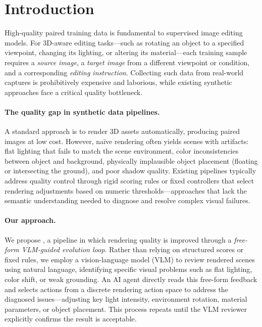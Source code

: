 \section{Introduction}
\label{sec:intro}

High-quality paired training data is fundamental to supervised image editing models.
For 3D-aware editing tasks---such as rotating an object to a specified viewpoint,
changing its lighting, or altering its material---each training sample requires
a \emph{source image}, a \emph{target image} from a different viewpoint or condition,
and a corresponding \emph{editing instruction}.
Collecting such data from real-world captures is prohibitively expensive and laborious,
while existing synthetic approaches face a critical quality bottleneck.

\paragraph{The quality gap in synthetic data pipelines.}
A standard approach is to render 3D assets automatically, producing paired images at low cost.
However, na\"{i}ve rendering often yields scenes with artifacts:
flat lighting that fails to match the scene environment,
color inconsistencies between object and background,
physically implausible object placement (floating or intersecting the ground),
and poor shadow quality.
Existing pipelines typically address quality control through rigid scoring rules or
fixed controllers that select rendering adjustments based on numeric thresholds---approaches
that lack the semantic understanding needed to diagnose and resolve complex visual failures.

\paragraph{Our approach.}
We propose \dataevolver{}, a pipeline in which rendering quality is improved through
a \emph{free-form VLM-guided evolution loop}.
Rather than relying on structured scores or fixed rules,
we employ a vision-language model (VLM) to review rendered scenes using natural language,
identifying specific visual problems such as flat lighting, color shift, or weak grounding.
An AI agent directly reads this free-form feedback and selects actions from a discrete
rendering action space to address the diagnosed issues---adjusting key light intensity,
environment rotation, material parameters, or object placement.
This process repeats until the VLM reviewer explicitly confirms the result is acceptable.

